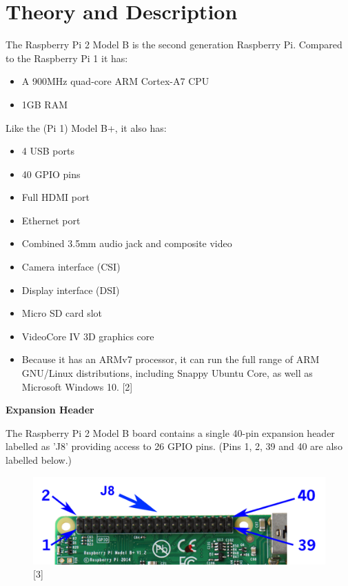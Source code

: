 \documentclass[11pt,a4paper]{article}
\begin{document}
	\section{Theory and Description}
	The Raspberry Pi 2 Model B is the second generation Raspberry Pi. Compared to the Raspberry Pi 1 it has:
	\begin{itemize}
	\item A 900MHz quad-core ARM Cortex-A7 CPU
	\item 1GB RAM
	\end{itemize}
	Like the (Pi 1) Model B+, it also has:
	\begin{itemize}
			\item 4 USB ports
			\item 40 GPIO pins
			\item Full HDMI port
			\item Ethernet port
			\item Combined 3.5mm audio jack and composite video
			\item Camera interface (CSI)
			\item Display interface (DSI)
			\item Micro SD card slot
			\item VideoCore IV 3D graphics core
			\item Because it has an ARMv7 processor, it can run the full range of ARM GNU/Linux distributions, including Snappy Ubuntu Core, as well as Microsoft Windows 10. [2]
	\end{itemize}
	
	\textbf{Expansion Header}
	
	The Raspberry Pi 2 Model B board contains a single 40-pin expansion header labelled as 'J8' providing access to 26 GPIO pins.
	(Pins 1, 2, 39 and 40 are also labelled below.)
			\begin{figure}[h!]
				\includegraphics[scale=0.7]{j8h.png}
				\centering
				\caption{[3]}
			\end{figure} 
	
\end{document}
